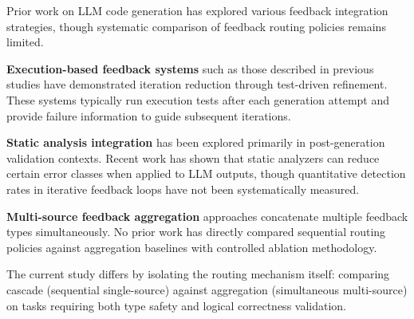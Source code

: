 
Prior work on LLM code generation has explored various feedback integration strategies, though systematic comparison of feedback routing policies remains limited.

\textbf{Execution-based feedback systems} such as those described in previous studies have demonstrated iteration reduction through test-driven refinement. These systems typically run execution tests after each generation attempt and provide failure information to guide subsequent iterations.

\textbf{Static analysis integration} has been explored primarily in post-generation validation contexts. Recent work has shown that static analyzers can reduce certain error classes when applied to LLM outputs, though quantitative detection rates in iterative feedback loops have not been systematically measured.

\textbf{Multi-source feedback aggregation} approaches concatenate multiple feedback types simultaneously. No prior work has directly compared sequential routing policies against aggregation baselines with controlled ablation methodology.

The current study differs by isolating the routing mechanism itself: comparing cascade (sequential single-source) against aggregation (simultaneous multi-source) on tasks requiring both type safety and logical correctness validation.

